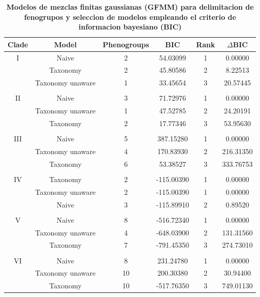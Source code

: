 \documentclass[
  11pt,
]{article}
\begin{document}
\begin{table}[H]

\caption{\label{tab:table2}\textbf{Modelos de mezclas finitas gaussianas (GFMM) para delimitacion de fenogrupos y seleccion de modelos empleando el criterio de informacion bayesiano (BIC)}}
\centering
\fontsize{8}{10}\selectfont
\begin{tabular}[t]{cccccc}
\toprule
Clade & Model & Phenogroups & BIC & Rank & $\Delta$BIC\\
\midrule
I & Naive & 2 & 54.03099 & 1 & 0.00000\\
 & Taxonomy & 2 & 45.80586 & 2 & 8.22513\\
 & Taxonomy unaware & 1 & 33.45654 & 3 & 20.57445\\
 &  &  &  &  & \\
II & Naive & 3 & 71.72976 & 1 & 0.00000\\
 & Taxonomy unaware & 1 & 47.52785 & 2 & 24.20191\\
 & Taxonomy & 2 & 17.77346 & 3 & 53.95630\\
 &  &  &  &  & \\
III & Naive & 5 & 387.15280 & 1 & 0.00000\\
 & Taxonomy unaware & 4 & 170.83930 & 2 & 216.31350\\
 & Taxonomy & 6 & 53.38527 & 3 & 333.76753\\
 &  &  &  &  & \\
IV & Taxonomy & 2 & -115.00390 & 1 & 0.00000\\
 & Taxonomy unaware & 2 & -115.00390 & 1 & 0.00000\\
 & Naive & 3 & -115.89910 & 2 & 0.89520\\
 &  &  &  &  & \\
V & Naive & 8 & -516.72340 & 1 & 0.00000\\
 & Taxonomy unaware & 4 & -648.03900 & 2 & 131.31560\\
 & Taxonomy & 7 & -791.45350 & 3 & 274.73010\\
 &  &  &  &  & \\
VI & Naive & 8 & 231.24780 & 1 & 0.00000\\
 & Taxonomy unaware & 10 & 200.30380 & 2 & 30.94400\\
 & Taxonomy & 10 & -517.76350 & 3 & 749.01130\\
\bottomrule
\end{tabular}
\end{table}
\end{document}
